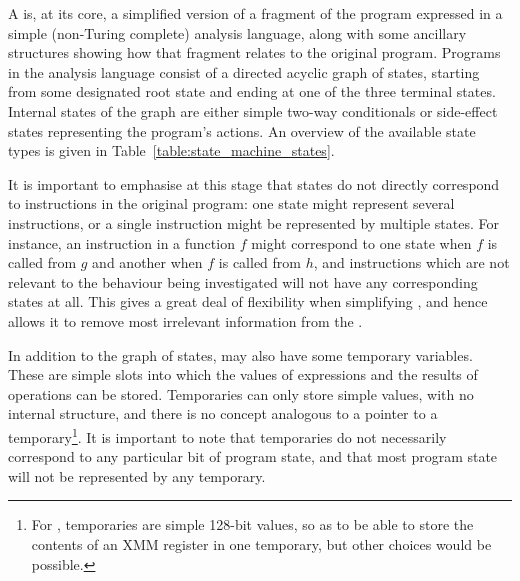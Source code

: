 A {\StateMachine} is, at its core, a simplified version of a fragment
of the program expressed in a simple (non-Turing complete) analysis
language, along with some ancillary structures showing how that
fragment relates to the original program.  Programs in the analysis
language consist of a directed acyclic graph of states, starting from
some designated root state and ending at one of the three terminal
states.  Internal states of the graph are either simple two-way
conditionals or side-effect states representing the program's actions.
An overview of the available state types is given in
Table~\ref{table:state_machine_states}.

It is important to emphasise at this stage that {\StateMachines}
states do not directly correspond to instructions in the original
program: one state might represent several instructions, or a single
instruction might be represented by multiple states.  For instance, an
instruction in a function $f$ might correspond to one state when $f$
is called from $g$ and another when $f$ is called from $h$, and
instructions which are not relevant to the behaviour being
investigated will not have any corresponding states at all.  This
gives {\technique} a great deal of flexibility when simplifying
{\StateMachines}, and hence allows it to remove most irrelevant
information from the {\StateMachine}.

In addition to the graph of states, {\StateMachines} may also have
some temporary variables.  These are simple slots into which the
values of expressions and the results of  operations can
be stored.  Temporaries can only store simple values, with no internal
structure, and there is no concept analogous to a pointer to a
temporary\footnote{For {\implementation}, {\StateMachine} temporaries
  are simple 128-bit values, so as to be able to store the contents of
  an XMM register in one temporary, but other choices would be
  possible.}.  It is important to note that {\StateMachine}
temporaries do not necessarily correspond to any particular bit of
program state, and that most program state will not be represented by
any temporary.

